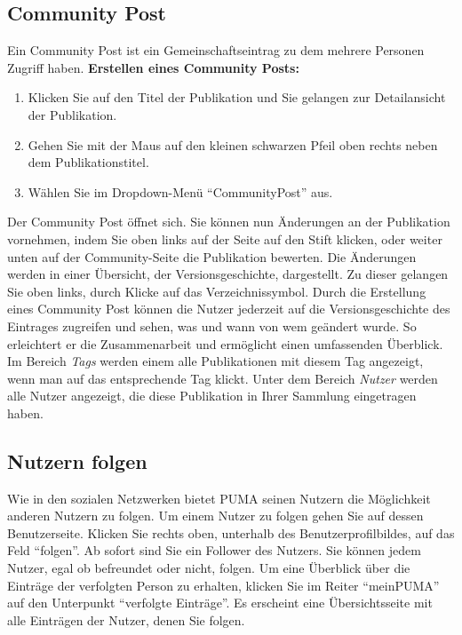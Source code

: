\subsection{Community Post}
Ein Community Post ist ein Gemeinschaftseintrag zu dem mehrere Personen Zugriff haben. \newline \newline
\textbf{Erstellen eines Community Posts:}
\begin{enumerate}
	\item Klicken Sie auf den Titel der Publikation und Sie gelangen zur Detailansicht der Publikation. 
	\item Gehen Sie mit der Maus auf den kleinen schwarzen Pfeil oben rechts neben dem Publikationstitel. 
	\item Wählen Sie im Dropdown-Menü \enquote{CommunityPost} aus. \end{enumerate}
Der Community Post öffnet sich. Sie können nun Änderungen an der Publikation vornehmen, indem Sie oben links auf der Seite auf den Stift klicken, oder weiter unten auf der Community-Seite die Publikation bewerten. Die Änderungen werden in einer Übersicht, der Versionsgeschichte, dargestellt. Zu dieser gelangen Sie oben links, durch Klicke auf das Verzeichnissymbol.\newline
Durch die Erstellung eines Community Post können die Nutzer jederzeit auf die Versionsgeschichte des Eintrages zugreifen und sehen, was und wann von wem geändert wurde. So erleichtert er die Zusammenarbeit und ermöglicht einen umfassenden Überblick. \newline
Im Bereich \textit{Tags} werden einem alle Publikationen mit diesem Tag angezeigt, wenn man auf das entsprechende Tag klickt. \newline
Unter dem Bereich \textit{Nutzer} werden alle Nutzer angezeigt, die diese Publikation in Ihrer Sammlung eingetragen haben.

\subsection{Nutzern folgen}
Wie in den sozialen Netzwerken bietet PUMA seinen Nutzern die Möglichkeit anderen Nutzern zu folgen. \newline
Um einem Nutzer zu folgen gehen Sie auf dessen Benutzerseite. Klicken Sie rechts oben, unterhalb des Benutzerprofilbildes, auf das Feld \enquote{folgen}. Ab sofort sind Sie ein Follower des Nutzers. Sie können jedem Nutzer, egal ob befreundet oder nicht, folgen. \newline \newline
Um eine Überblick über die Einträge der verfolgten Person zu erhalten, klicken Sie im Reiter \enquote{meinPUMA} auf den Unterpunkt \enquote{verfolgte Einträge}. Es erscheint eine Übersichtsseite mit alle Einträgen der Nutzer, denen Sie folgen. 




